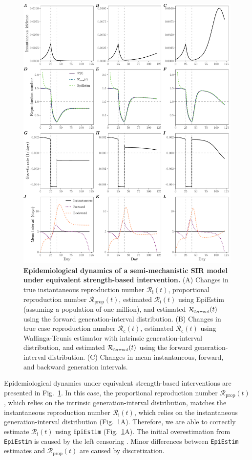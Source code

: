\documentclass[12pt]{article}
\newcommand{\fref}[1]{Fig.~\ref{fig:#1}}
\newcommand{\Rx}[1]{\ensuremath{{\mathcal R}_{#1}}\xspace}
\newcommand{\Rc}{\Rx{\mathrm{c}}}
\newcommand{\Ri}{\Rx{\mathrm{i}}}
\newcommand{\RR}{\ensuremath{{\mathcal R}}\xspace}
\newcommand{\Rprop}{\Rx{\mathrm{prop}}}
\newcommand{\tsub}[2]{#1_{{\textrm{\tiny #2}}}}
\begin{document}
\begin{figure}[!th]
\includegraphics[width=\textwidth]{figure_sir_beta.pdf}
\caption{
\textbf{Epidemiological dynamics of a semi-mechanistic SIR model under equivalent strength-based intervention.}
(A) Changes in true instantaneous reproduction number $\Ri(t)$, proportional reproduction number $\Rprop(t)$, estimated $\Ri(t)$ using EpiEstim (assuming a population of one million), and estimated $\tsub{\RR}{forward}(t)$ using the forward generation-interval distribution.
(B) Changes in true case reproduction number $\Rc(t)$, estimated $\Rc(t)$ using Wallinga-Teunis estimator with intrinsic generation-interval distribution, and estimated $\tsub{\RR}{forward}(t)$ using the forward generation-interval distribution.
(C) Changes in mean instantaneous, forward, and backward generation intervals.
}
\label{fig:sir_beta}
\end{figure}

Epidemiological dynamics under equivalent strength-based interventions are presented in \fref{sir_beta}.
In this case, the proportional reproduction number $\Rprop(t)$, which relies on the intrinsic generation-interval distribution, matches the instantaneous reproduction number $\Ri(t)$, which relies on the instantaneous generation-interval distribution (\fref{sir_beta}A).
Therefore, we are able to correctly estimate $\Ri(t)$ using \texttt{EpiEstim} (\fref{sir_beta}A).
The initial overestimation from \texttt{EpiEstim} is caused by the left censoring \citep{gostic2020practical}.
Minor differences between \texttt{EpiEstim} estimates and $\Rprop(t)$ are caused by discretization.
\end{document}
